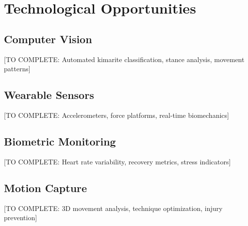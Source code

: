 \section{Technological Opportunities}

\subsection{Computer Vision}

[TO COMPLETE: Automated kimarite classification, stance analysis, movement patterns]

\subsection{Wearable Sensors}

[TO COMPLETE: Accelerometers, force platforms, real-time biomechanics]

\subsection{Biometric Monitoring}

[TO COMPLETE: Heart rate variability, recovery metrics, stress indicators]

\subsection{Motion Capture}

[TO COMPLETE: 3D movement analysis, technique optimization, injury prevention]